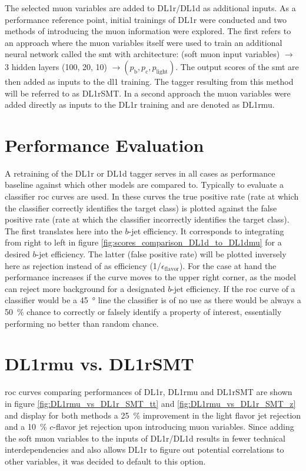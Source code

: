 The selected muon variables are added to DL1r/DL1d as additional inputs. As a performance reference point, initial trainings of DL1r were conducted and two methods of introducing the muon information were explored. The first refers to an approach where the muon variables itself were used to train an additional neural network called the \ac{smt} with architecture: (soft muon input variables) $\rightarrow$ 3 hidden layers (100, 20, 10) $\rightarrow (p_\text{b}, p_\text{c}, p_\text{light})$. The output scores of the \ac{smt} are then added as inputs to the \ac{dl1} training. The tagger resulting from this method will be referred to as DL1rSMT. In a second approach the muon variables were added directly as inputs to the DL1r training and are denoted as DL1rmu.

\section{Performance Evaluation}
A retraining of the DL1r or DL1d tagger serves in all cases as performance baseline against which other models are compared to. Typically to evaluate a classifier \ac{roc} curves are used. In these curves the true positive rate (rate at which the classifier correctly identifies the target class) is plotted against the false positive rate (rate at which the classifier incorrectly identifies the target class). The first translates here into the $b$-jet efficiency. It corresponds to integrating from right to left in figure \ref{fig:scores_comparison_DL1d_to_DL1dmu} for a desired $b$-jet efficiency. The latter (false positive rate) will be plotted inversely here as rejection instead of as efficiency (1/$\epsilon_\mathrm{flavor}$). For the case at hand the performance increases if the curve moves to the upper right corner, as the model can reject more background for a designated $b$-jet efficiency. If the \ac{roc} curve of a classifier would be a \qty{45}{\degree} line the classifier is of no use as there would be always a \qty{50}{\percent} chance to correctly or falsely identify a property of interest, essentially performing no better than random chance.

\section{DL1rmu vs. DL1rSMT}
\ac{roc} curves comparing performances of DL1r, DL1rmu and DL1rSMT are shown in figure \ref{fig:DL1rmu_vs_DL1r_SMT_tt} and \ref{fig:DL1rmu_vs_DL1r_SMT_z} and display for both methods a \qty{25}{\percent} improvement in the light flavor jet rejection and a \qty{10}{\percent} $c$-flavor jet rejection upon introducing muon variables. Since adding the soft muon variables to the inputs of DL1r/DL1d results in fewer technical interdependencies and also allows DL1r to figure out potential correlations to other variables, it was decided to default to this option.


